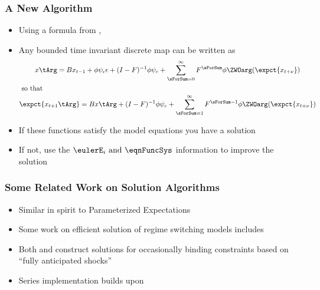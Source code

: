 \documentclass[notheorems]{beamer}
\begin{document}
\begin{frame}
  \frametitle{A New Algorithm}
 {\small  
\begin{itemize}
\item Using a formula from \citep{anderson10},
 \item Any bounded time invariant discrete map can be written as
    \begin{gather*}
      	 x\tArg =B x_{t-1}+ \phi \psi_\epsilon\epsilon + (I - F)^{-1} \phi \psi_c + \sum_{\sForSum=0}^\infty F^\sForSum \phi \ZWOarg(\expct{x_{t+\nu}})\\ \intertext{ so that}
\expct{ x_{t+1}\tArg} =B x\tArg  + (I - F)^{-1} \phi \psi_c+ \sum_{\sForSum =1}^\infty F^{\sForSum-1} \phi \ZWOarg(\expct{x_{t+\nu}}) 
    \end{gather*}
   \item If these functions satisfy the model equations you have a solution
   \item If not, use the $\eulerE_i \text{ and } \eqnFuncSys $ information to improve the solution
  \end{itemize}
}
\end{frame}

\begin{frame}
  \frametitle{Some Related Work on Solution Algorithms}
  \begin{itemize}
\item Similar in spirit to Parameterized Expectations\cite{haan90:_solvin_stoch}
\item Some work on efficient solution of regime switching models includes 
\cite{RePEc:bny:wpaper:0058}
\item Both \cite{holden15:_exist_dsge} and  \cite{guerrieri15:_occbin}
 construct solutions for occasionally binding constraints based on ``fully anticipated shocks''
\item Series implementation builds upon \cite{Judd2014}
  \end{itemize}
\end{frame}
\end{document}
